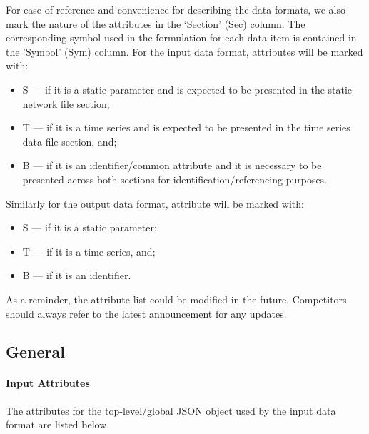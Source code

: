 \documentclass{article}
\begin{document}
For ease of reference and convenience for describing the data formats, we also
mark the nature of the attributes in the `Section' (Sec) column. The corresponding symbol used in the formulation for each data item is contained in the 'Symbol' (Sym) column.
For the input data format, attributes will be marked with:
\begin{itemize}
\item S --- if it is a static parameter and is expected to be presented in the static network file section;
\item T --- if it is a time series and is expected to be presented in the time series data file section, and;
\item B --- if it is an identifier/common attribute and it is necessary to be presented across both sections for identification/referencing purposes.
\end{itemize}
Similarly for the output data format, attribute will be marked with:
\begin{itemize}
\item S --- if it is a static parameter;
\item T --- if it is a time series, and;
\item B --- if it is an identifier.
\end{itemize}
As a reminder, the attribute list could be modified in the future.
Competitors should always refer to the latest announcement for any
updates.





\subsection{General}
\label{nom:top-level}

\paragraph{Input Attributes}
The attributes for the top-level/global JSON object
used by the input data format are listed below.
\end{document}
